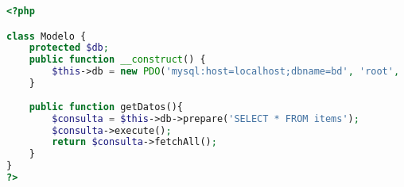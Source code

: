 \begin{lstlisting}[label=mvp_modelo,caption=Clase Modelo,language=PHP]
<?php

class Modelo {
	protected $db;
	public function __construct() {
		$this->db = new PDO('mysql:host=localhost;dbname=bd', 'root', 'password');	
	}
	
	public function getDatos(){
		$consulta = $this->db->prepare('SELECT * FROM items');
		$consulta->execute();
		return $consulta->fetchAll();
	}
}
?>
\end{lstlisting}
